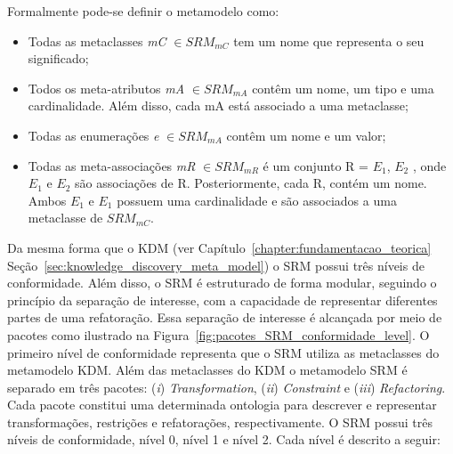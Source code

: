 Formalmente pode-se definir o metamodelo como:

\begin{itemize}
	\item Todas as metaclasses \textit{mC} $\in SRM_{mC}$ tem um nome que representa o seu significado;
	\item Todos os meta-atributos \textit{mA} $\in SRM_{mA}$ contêm um nome, um tipo e uma cardinalidade. Além disso, cada mA está associado a uma metaclasse;
	\item Todas as enumerações \textit{e} $\in SRM_{mA}$ contêm um nome e um valor;
	\item Todas as meta-associações \textit{mR} $\in SRM_{mR}$ é um conjunto R = $E_{1}$, $E_{2}$  , onde  $E_{1}$ e $E_{2}$ são associações de R. Posteriormente, cada R, contém um nome. Ambos $E_{1}$  e $E_{1}$ possuem uma cardinalidade e são associados a uma metaclasse de $SRM_{mC}$.
\end{itemize}

Da mesma forma que o KDM (ver Capítulo~\ref{chapter:fundamentacao_teorica} Seção~\ref{sec:knowledge_discovery_meta_model}) o SRM possui três níveis de conformidade. Além disso, o SRM é estruturado de forma modular, seguindo o princípio da separação de interesse, com a capacidade de representar diferentes partes de uma refatoração. Essa separação de interesse é alcançada por meio de pacotes como ilustrado na Figura~\ref{fig:pacotes_SRM_conformidade_level}. O primeiro nível de conformidade representa que o SRM utiliza as metaclasses do metamodelo KDM. Além das metaclasses do KDM o metamodelo SRM é separado em três pacotes: (\textit{i}) \textit{Transformation}, (\textit{ii}) \textit{Constraint} e (\textit{iii}) \textit{Refactoring}. Cada pacote constitui uma determinada ontologia para descrever e representar transformações, restrições e refatorações, respectivamente. O SRM possui três níveis de conformidade, nível 0, nível 1 e nível 2. Cada nível é descrito a seguir:

